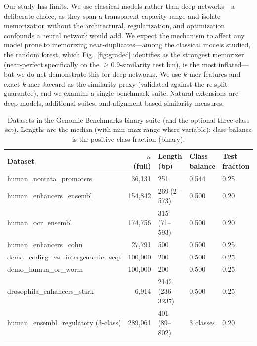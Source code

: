 \documentclass[webpdf,modern,large,namedate]{oup-authoring-template}%
\begin{document}
Our study has limits. We use classical models rather than deep networks---a deliberate choice, as they span a transparent capacity range and isolate memorization without the architectural, regularization, and optimization confounds a neural network would add. We expect the mechanism to affect any model prone to memorizing near-duplicates---among the classical models studied, the random forest, which Fig.~\ref{fig:graded} identifies as the strongest memorizer (near-perfect specifically on the $\ge0.9$-similarity test bin), is the most inflated---but we do not demonstrate this for deep networks. We use $k$-mer features and exact $k$-mer Jaccard as the similarity proxy (validated against the re-split guarantee), and we examine a single benchmark suite. Natural extensions are deep models, additional suites, and alignment-based similarity measures.


\begin{table}[tbp]
\begin{center}
\begin{minipage}{\textwidth}
\caption{Datasets in the Genomic Benchmarks binary suite (and the optional three-class set). Lengths are the median (with min--max range where variable); class balance is the positive-class fraction (binary).\label{tab:datasets}}
\footnotesize\setlength{\tabcolsep}{5pt}\begin{tabular}{@{}lrlll@{}}
\toprule
Dataset & $n$ (full) & Length (bp) & Class balance & Test fraction\\
\midrule
human\_nontata\_promoters          & 36{,}131  & 251              & 0.544 & 0.25\\
human\_enhancers\_ensembl          & 154{,}842 & 269 (2--573)     & 0.500 & 0.20\\
human\_ocr\_ensembl                & 174{,}756 & 315 (71--593)    & 0.500 & 0.20\\
human\_enhancers\_cohn             & 27{,}791  & 500              & 0.500 & 0.25\\
demo\_coding\_vs\_intergenomic\_seqs & 100{,}000 & 200              & 0.500 & 0.25\\
demo\_human\_or\_worm               & 100{,}000 & 200              & 0.500 & 0.25\\
drosophila\_enhancers\_stark       & 6{,}914   & 2142 (236--3237) & 0.500 & 0.25\\
\midrule
human\_ensembl\_regulatory (3-class) & 289{,}061 & 401 (89--802)  & 3 classes & 0.20\\
\botrule
\end{tabular}
\end{minipage}
\end{center}
\end{table}
\end{document}
